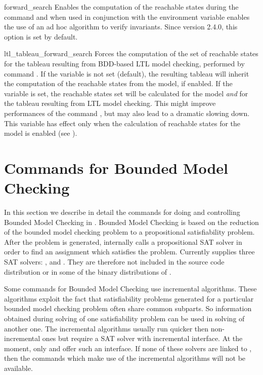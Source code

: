 \begin{nusmvVar} {forward\_search}{}{}
Enables the computation of the reachable states during the
 command and when used in conjunction with the
 environment variable enables the use of an ad hoc
algorithm to verify invariants. Since version 2.4.0, this option is
set by default.
\end{nusmvVar}


\begin{nusmvVar} {ltl\_tableau\_forward\_search}{}{}
Forces the computation of the set of reachable states for the tableau
resulting from BDD-based LTL model checking, performed by command
. If the variable
 is not set (default), the
resulting tableau will inherit the computation of the reachable states
from the model, if enabled. If the variable is set, the reachable
states set will be calculated for the model \emph{and} for the tableau
resulting from LTL model checking. This might improve performances of
the command , but may also lead to a dramatic
slowing down. This variable has effect only when the calculation of
reachable states for the model is enabled (see
).
\end{nusmvVar}








\section{Commands for Bounded Model Checking}
\label{Commands for Bounded Model Checking}

In this section we describe in detail the commands for doing and
controlling Bounded Model Checking in \nusmv.  Bounded Model Checking
is based on the reduction of the bounded model checking problem to a
propositional satisfiability problem. After the problem is generated,
\nusmv internally calls a propositional SAT solver in order to find an
assignment which satisfies the problem.  Currently \nusmv supplies
three SAT solvers: \SIM, \zchaff and \minisat.  \zchaffminisatnotice
They are therefore not included in the source code distribution or in
some of the binary distributions of \nusmv.

Some commands for Bounded Model Checking use incremental algorithms.
These algorithms exploit the fact that satisfiability
problems generated for a particular bounded model checking problem
often share common subparts. So information obtained during solving of
one satisfiability problem can be used in solving of
another one. The incremental algorithms usually run quicker then
non-incremental ones but require a SAT solver with incremental
interface. At the moment, only \zchaff and \minisat offer such an
interface.  If none of these solvers are linked to \nusmv, then the
commands which make use of the incremental algorithms will not be available.

